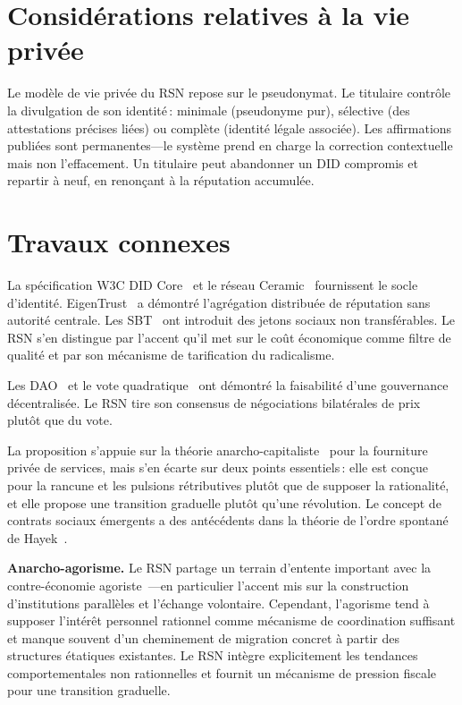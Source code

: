 \documentclass[11pt,a4paper,twocolumn]{article}
\begin{document}
\section{Considérations relatives à la vie privée}

Le modèle de vie privée du RSN repose sur le pseudonymat. Le titulaire contrôle la divulgation de son identité\,: minimale (pseudonyme pur), sélective (des attestations précises liées) ou complète (identité légale associée). Les affirmations publiées sont permanentes---le système prend en charge la correction contextuelle mais non l'effacement. Un titulaire peut abandonner un DID compromis et repartir à neuf, en renonçant à la réputation accumulée.

\section{Travaux connexes}

La spécification W3C DID Core~\cite{did2022} et le réseau Ceramic~\cite{ceramic2023} fournissent le socle d'identité. EigenTrust~\cite{kamvar2003} a démontré l'agrégation distribuée de réputation sans autorité centrale. Les SBT~\cite{weyl2022} ont introduit des jetons sociaux non transférables. Le RSN s'en distingue par l'accent qu'il met sur le coût économique comme filtre de qualité et par son mécanisme de tarification du radicalisme.

Les DAO~\cite{buterin2014} et le vote quadratique~\cite{buterin2019} ont démontré la faisabilité d'une gouvernance décentralisée. Le RSN tire son consensus de négociations bilatérales de prix plutôt que du vote.

La proposition s'appuie sur la théorie anarcho-capitaliste~\cite{rothbard1973,hoppe2001} pour la fourniture privée de services, mais s'en écarte sur deux points essentiels\,: elle est conçue pour la rancune et les pulsions rétributives plutôt que de supposer la rationalité, et elle propose une transition graduelle plutôt qu'une révolution. Le concept de contrats sociaux émergents a des antécédents dans la théorie de l'ordre spontané de Hayek~\cite{hayek1973}.

\textbf{Anarcho-agorisme.} Le RSN partage un terrain d'entente important avec la contre-économie agoriste~\cite{konkin2006}---en particulier l'accent mis sur la construction d'institutions parallèles et l'échange volontaire. Cependant, l'agorisme tend à supposer l'intérêt personnel rationnel comme mécanisme de coordination suffisant et manque souvent d'un cheminement de migration concret à partir des structures étatiques existantes. Le RSN intègre explicitement les tendances comportementales non rationnelles et fournit un mécanisme de pression fiscale pour une transition graduelle.
\end{document}
